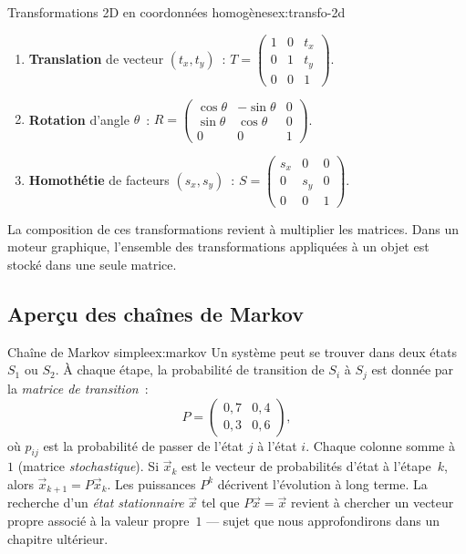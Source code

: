 \begin{example}{Transformations 2D en coordonnées homogènes}{ex:transfo-2d}
  \begin{enumerate}[label=(\alph*)]
    \item \textbf{Translation} de vecteur $(t_x,t_y)$~:
    $T=\begin{pmatrix}1&0&t_x\\0&1&t_y\\0&0&1\end{pmatrix}$.
    \item \textbf{Rotation} d'angle $\theta$~:
    $R=\begin{pmatrix}\cos\theta&-\sin\theta&0\\\sin\theta&\cos\theta&0\\0&0&1\end{pmatrix}$.
    \item \textbf{Homothétie} de facteurs $(s_x,s_y)$~:
    $S=\begin{pmatrix}s_x&0&0\\0&s_y&0\\0&0&1\end{pmatrix}$.
  \end{enumerate}
  La composition de ces transformations revient à multiplier les matrices.
  Dans un moteur graphique, l'ensemble des transformations appliquées à un
  objet est stocké dans une seule matrice.
\end{example}

\subsection{Aperçu des chaînes de Markov}\label{subsec:markov}

\begin{example}{Chaîne de Markov simple}{ex:markov}
  Un système peut se trouver dans deux états $S_1$ ou $S_2$. À chaque
  étape, la probabilité de transition de $S_i$ à $S_j$ est donnée par la
  \emph{matrice de transition}~:
  \[
    P=\begin{pmatrix}0{,}7&0{,}4\\0{,}3&0{,}6\end{pmatrix},
  \]
  où $p_{ij}$ est la probabilité de passer de l'état $j$ à l'état $i$.
  Chaque colonne somme à~$1$ (matrice \emph{stochastique}). Si $\vec{x}_k$ est le vecteur de probabilités d'état à
  l'étape~$k$, alors $\vec{x}_{k+1}=P\vec{x}_k$. Les puissances $P^k$
  décrivent l'évolution à long terme. La recherche d'un \emph{état
  stationnaire} $\vec{x}$ tel que $P\vec{x}=\vec{x}$ revient à chercher
  un vecteur propre associé à la valeur propre~$1$ --- sujet que nous
  approfondirons dans un chapitre ultérieur.
\end{example}

